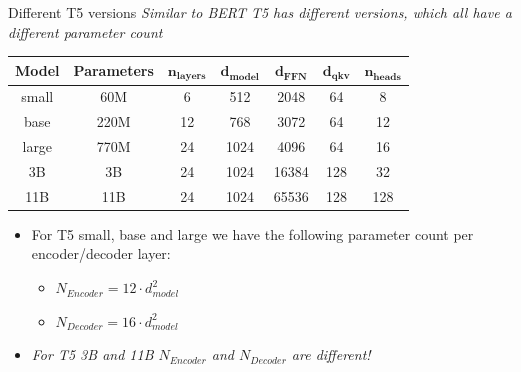 \begin{frame}{Different T5 versions}
\textit{Similar to BERT T5 has different versions, which all have a different parameter count} 

\begin{table}[h!]
\centering
\small %
\begin{tabular}{|c|c|c|c|c|c|c|}
\hline
\textbf{Model} & \textbf{Parameters} & $\bm{n_{layers}}$ & $\bm{d_{model}}$ & $\bm{d_{FFN}}$ & $\bm{d_{qkv}}$ & $\bm{n_{heads}}$ \\ \hline
small  & 60M  & 6  & 512  & 2048 & 64 & 8 \\ \hline
base   & 220M & 12 & 768  & 3072 & 64 & 12 \\ \hline
large  & 770M & 24 & 1024 & 4096 & 64 & 16 \\ \hline
3B     & 3B   & 24 & 1024 & 16384 & 128 & 32 \\ \hline
11B    & 11B  & 24 & 1024 & 65536 & 128 & 128 \\ \hline
\end{tabular}
\end{table}

\begin{itemize}
    \item For T5 small, base and large we have the following parameter count per encoder/decoder layer:
    \begin{itemize}
        \item $N_{Encoder} = 12\cdot d_{model}^2$
        \item $N_{Decoder} = 16\cdot d_{model}^2$
    \end{itemize}
		\item \textit{For T5 3B and 11B $N_{Encoder}$ and $N_{Decoder}$ are different!}
\end{itemize}
    
\end{frame}




